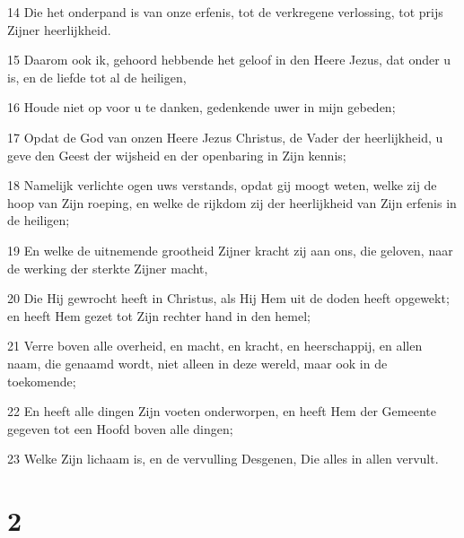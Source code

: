 \par 14 Die het onderpand is van onze erfenis, tot de verkregene verlossing, tot prijs Zijner heerlijkheid.
\par 15 Daarom ook ik, gehoord hebbende het geloof in den Heere Jezus, dat onder u is, en de liefde tot al de heiligen,
\par 16 Houde niet op voor u te danken, gedenkende uwer in mijn gebeden;
\par 17 Opdat de God van onzen Heere Jezus Christus, de Vader der heerlijkheid, u geve den Geest der wijsheid en der openbaring in Zijn kennis;
\par 18 Namelijk verlichte ogen uws verstands, opdat gij moogt weten, welke zij de hoop van Zijn roeping, en welke de rijkdom zij der heerlijkheid van Zijn erfenis in de heiligen;
\par 19 En welke de uitnemende grootheid Zijner kracht zij aan ons, die geloven, naar de werking der sterkte Zijner macht,
\par 20 Die Hij gewrocht heeft in Christus, als Hij Hem uit de doden heeft opgewekt; en heeft Hem gezet tot Zijn rechter hand in den hemel;
\par 21 Verre boven alle overheid, en macht, en kracht, en heerschappij, en allen naam, die genaamd wordt, niet alleen in deze wereld, maar ook in de toekomende;
\par 22 En heeft alle dingen Zijn voeten onderworpen, en heeft Hem der Gemeente gegeven tot een Hoofd boven alle dingen;
\par 23 Welke Zijn lichaam is, en de vervulling Desgenen, Die alles in allen vervult.

\chapter{2}

